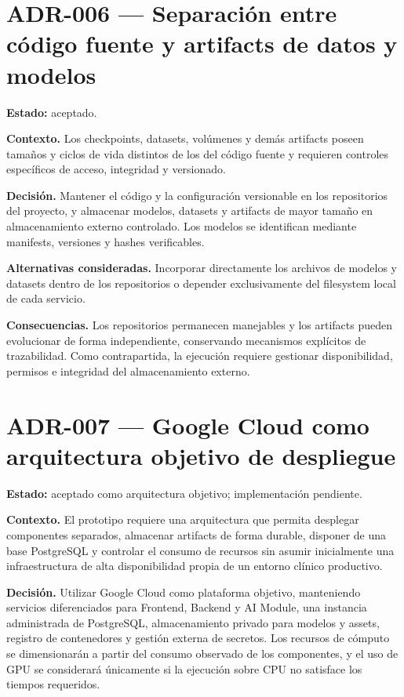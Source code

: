\section*{ADR-006 --- Separación entre código fuente y artifacts de datos y modelos}
\label{adr:006-separacion-codigo-artifacts}

\textbf{Estado:} aceptado.

\textbf{Contexto.} Los checkpoints, datasets, volúmenes y demás artifacts poseen tamaños y ciclos de vida distintos de los del código fuente y requieren controles específicos de acceso, integridad y versionado.

\textbf{Decisión.} Mantener el código y la configuración versionable en los repositorios del proyecto, y almacenar modelos, datasets y artifacts de mayor tamaño en almacenamiento externo controlado. Los modelos se identifican mediante manifests, versiones y hashes verificables.

\textbf{Alternativas consideradas.} Incorporar directamente los archivos de modelos y datasets dentro de los repositorios o depender exclusivamente del filesystem local de cada servicio.

\textbf{Consecuencias.} Los repositorios permanecen manejables y los artifacts pueden evolucionar de forma independiente, conservando mecanismos explícitos de trazabilidad. Como contrapartida, la ejecución requiere gestionar disponibilidad, permisos e integridad del almacenamiento externo.

\section*{ADR-007 --- Google Cloud como arquitectura objetivo de despliegue}
\label{adr:007-google-cloud-despliegue}

\textbf{Estado:} aceptado como arquitectura objetivo; implementación pendiente.

\textbf{Contexto.} El prototipo requiere una arquitectura que permita desplegar componentes separados, almacenar artifacts de forma durable, disponer de una base PostgreSQL y controlar el consumo de recursos sin asumir inicialmente una infraestructura de alta disponibilidad propia de un entorno clínico productivo.

\textbf{Decisión.} Utilizar Google Cloud como plataforma objetivo, manteniendo servicios diferenciados para Frontend, Backend y AI Module, una instancia administrada de PostgreSQL, almacenamiento privado para modelos y assets, registro de contenedores y gestión externa de secretos. Los recursos de cómputo se dimensionarán a partir del consumo observado de los componentes, y el uso de GPU se considerará únicamente si la ejecución sobre CPU no satisface los tiempos requeridos.

